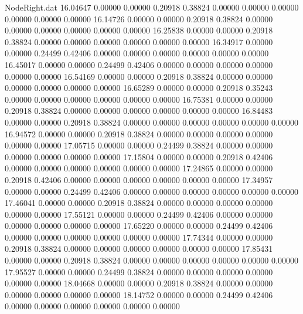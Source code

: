 \begin{filecontents}{NodeRight.dat}
  16.04647    0.00000    0.00000     0.20918    0.38824    0.00000    0.00000    0.00000    0.00000    0.00000    0.00000
  16.14726    0.00000    0.00000     0.20918    0.38824    0.00000    0.00000    0.00000    0.00000    0.00000    0.00000
  16.25838    0.00000    0.00000     0.20918    0.38824    0.00000    0.00000    0.00000    0.00000    0.00000    0.00000
  16.34917    0.00000    0.00000     0.24499    0.42406    0.00000    0.00000    0.00000    0.00000    0.00000    0.00000
  16.45017    0.00000    0.00000     0.24499    0.42406    0.00000    0.00000    0.00000    0.00000    0.00000    0.00000
  16.54169    0.00000    0.00000     0.20918    0.38824    0.00000    0.00000    0.00000    0.00000    0.00000    0.00000
  16.65289    0.00000    0.00000     0.20918    0.35243    0.00000    0.00000    0.00000    0.00000    0.00000    0.00000
  16.75381    0.00000    0.00000     0.20918    0.38824    0.00000    0.00000    0.00000    0.00000    0.00000    0.00000
  16.84483    0.00000    0.00000     0.20918    0.38824    0.00000    0.00000    0.00000    0.00000    0.00000    0.00000
  16.94572    0.00000    0.00000     0.20918    0.38824    0.00000    0.00000    0.00000    0.00000    0.00000    0.00000
  17.05715    0.00000    0.00000     0.24499    0.38824    0.00000    0.00000    0.00000    0.00000    0.00000    0.00000
  17.15804    0.00000    0.00000     0.20918    0.42406    0.00000    0.00000    0.00000    0.00000    0.00000    0.00000
  17.24865    0.00000    0.00000     0.20918    0.42406    0.00000    0.00000    0.00000    0.00000    0.00000    0.00000
  17.34957    0.00000    0.00000     0.24499    0.42406    0.00000    0.00000    0.00000    0.00000    0.00000    0.00000
  17.46041    0.00000    0.00000     0.20918    0.38824    0.00000    0.00000    0.00000    0.00000    0.00000    0.00000
  17.55121    0.00000    0.00000     0.24499    0.42406    0.00000    0.00000    0.00000    0.00000    0.00000    0.00000
  17.65220    0.00000    0.00000     0.24499    0.42406    0.00000    0.00000    0.00000    0.00000    0.00000    0.00000
  17.74344    0.00000    0.00000     0.20918    0.38824    0.00000    0.00000    0.00000    0.00000    0.00000    0.00000
  17.85431    0.00000    0.00000     0.20918    0.38824    0.00000    0.00000    0.00000    0.00000    0.00000    0.00000
  17.95527    0.00000    0.00000     0.24499    0.38824    0.00000    0.00000    0.00000    0.00000    0.00000    0.00000
  18.04668    0.00000    0.00000     0.20918    0.38824    0.00000    0.00000    0.00000    0.00000    0.00000    0.00000
  18.14752    0.00000    0.00000     0.24499    0.42406    0.00000    0.00000    0.00000    0.00000    0.00000    0.00000

\end{filecontents}
